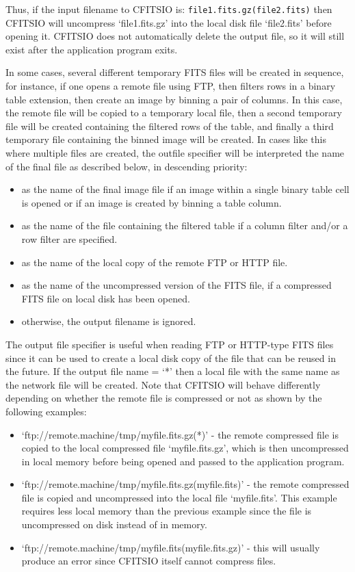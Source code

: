 \documentclass[11pt]{book}
\begin{document}
Thus, if the input filename to CFITSIO is:
\verb+file1.fits.gz(file2.fits)+
then CFITSIO will uncompress `file1.fits.gz' into the local disk file
`file2.fits' before opening it.  CFITSIO does not automatically delete
the output file, so it will still exist after the application program
exits.

In some cases, several different temporary FITS files will be created
in sequence, for instance, if one opens a remote file using FTP, then
filters rows in a binary table extension, then create an image by
binning a pair of columns.  In this case, the remote file will be
copied to a temporary local file, then a second temporary file will be
created containing the filtered rows of the table, and finally a third
temporary file containing the binned image will be created.  In cases
like this where multiple files are created, the outfile specifier will
be interpreted the name of the final file as described below, in descending
priority:

\begin{itemize}
\item
as the name of the final image file if an image within a single binary
table cell is opened or if an image is created by binning a table column.
\item
as the name of the file containing the filtered table if a column filter
and/or a row filter are specified.
\item
as the name of the local copy of the remote FTP or HTTP file.
\item
as the name of the uncompressed version of the FITS file, if a
compressed FITS file on local disk has been opened.
\item
otherwise, the output filename is ignored.
\end{itemize}


The output file specifier is useful when reading FTP or HTTP-type
FITS files since it can be used to create a local disk copy of the file
that can be reused in the future.  If the output file name = `*' then a
local file with the same name as the network file will be created.
Note that CFITSIO will behave differently depending on whether the
remote file is compressed or not as shown by the following examples:
\begin{itemize}
\item
`ftp://remote.machine/tmp/myfile.fits.gz(*)' - the remote compressed
file is copied to the local compressed file `myfile.fits.gz', which
is then uncompressed in local memory before being opened and passed
to the application program.

\item
`ftp://remote.machine/tmp/myfile.fits.gz(myfile.fits)' - the remote
compressed file is copied and uncompressed into the local file
`myfile.fits'.  This example requires less local memory than the
previous example since the file is uncompressed on disk instead of
in memory.

\item
`ftp://remote.machine/tmp/myfile.fits(myfile.fits.gz)' - this will
usually produce an error since CFITSIO itself cannot compress files.
\end{itemize}
\end{document}
